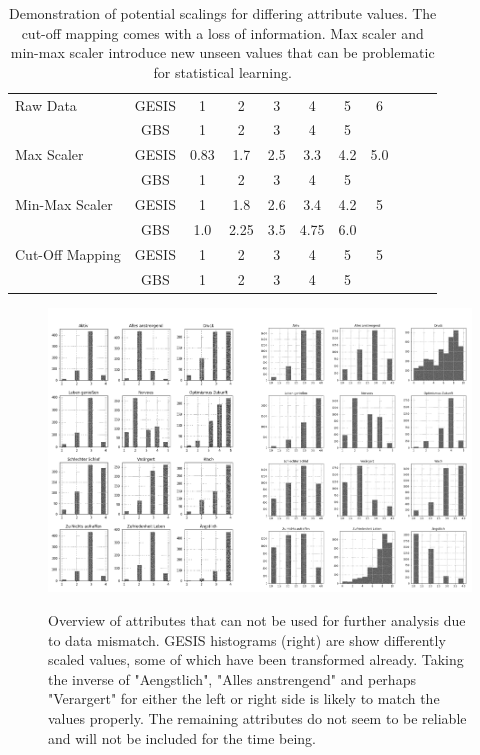 \begin{table}[ht]
    \begin{center}
            {\footnotesize
            \begin{tabular}{l|c|ccccccccc}
                \hline \hline
		Raw Data & GESIS & 1 & 2 & 3 & 4 & 5 & 6 \\
                     & GBS & 1 & 2 & 3 & 4 & 5 & \\
                \hline
		Max Scaler & GESIS & 0.83 & 1.7 & 2.5 & 3.3 & 4.2 & 5.0 \\
                     & GBS & 1 & 2 & 3 & 4 & 5 & \\
                \hline
		Min-Max Scaler & GESIS & 1 & 1.8 & 2.6 & 3.4 & 4.2 & 5 \\
                     & GBS & 1.0 & 2.25 & 3.5 & 4.75 & 6.0 & \\
                \hline
		Cut-Off Mapping & GESIS & 1 & 2 & 3 & 4 & 5 & 5 \\
                     & GBS & 1 & 2 & 3 & 4 & 5 & \\
	     \hline \hline
            \end{tabular}}
        \caption{Demonstration of potential scalings for differing attribute values. The cut-off mapping comes with a loss of information. Max scaler and min-max scaler introduce new unseen values that can be problematic for statistical learning.}
\label{Tab:DescripStatsRawData}
\end{center}
\end{table}

\begin{figure}[ht]
	\begin{center}
		\includegraphics[scale=0.62,angle=0]{fig/histo}
		\label{std}
		\caption{Overview of attributes that can not be used for further analysis due to data mismatch. GESIS histograms (right) are show differently scaled values, some of which have been transformed already. Taking the inverse of "Aengstlich", "Alles anstrengend" and perhaps "Verargert" for either the left or right side is likely to match the values properly. The remaining attributes do not seem to be reliable and will not be included for the time being.}
	\end{center}
\end{figure}



